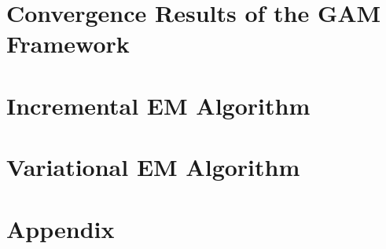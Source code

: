 \documentclass[11pt]{article}
\begin{document}
	\section{Convergence Results of the GAM Framework} \label{gam}
	
	\section{Incremental EM Algorithm} \label{incremental}
	
	\section{Variational EM Algorithm} \label{variational}
	
	\section*{Appendix}
	
\end{document}
